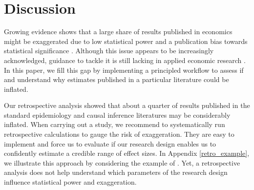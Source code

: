 \documentclass[12pt]{article}
\begin{document}



\section{Discussion}

        Growing evidence shows that a large share of results published in economics might be exaggerated due to low statistical power and a publication bias towards statistical significance \citep{brodeur_star_2016, ioannidis_power_2017, brodeur_methods_2020, ferraro_featureis_2020}. Although this issue appears to be increasingly acknowledged, guidance to tackle it is still lacking in applied economic research \citep{altoe_enhancing_2020, black_simulated_2022}. In this paper, we fill this gap by implementing a principled workflow to assess if and understand why estimates published in a particular literature could be inflated.
        
        Our retrospective analysis showed that about a quarter of results published in the standard epidemiology and causal inference literatures may be considerably inflated. When carrying out a study, we recommend to systematically run retrospective calculations to gauge the risk of exaggeration. They are easy to implement and force us to evaluate if our research design enables us to confidently estimate a credible range of effect sizes. In Appendix \ref{retro_example}, we illustrate this approach by considering the example of \cite{deryugina_mortality_2019}. Yet, a retrospective analysis does not help understand which parameters of the research design influence statistical power and exaggeration.
        
\end{document}
